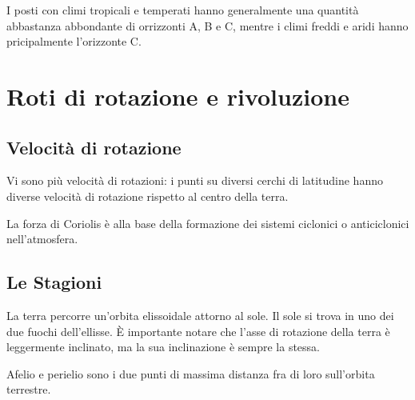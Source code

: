 \documentclass[a4paper]{article}
\begin{document}
I posti con climi tropicali e temperati hanno generalmente una quantità
abbastanza abbondante di orrizzonti A, B e C, mentre i climi freddi e aridi hanno pricipalmente
l'orizzonte C.

\pagebreak

\section{Roti di rotazione e rivoluzione}

\subsection{Velocità di rotazione}

Vi sono più velocità di rotazioni: i punti su diversi cerchi di latitudine hanno diverse velocità di rotazione rispetto al centro della terra.


La forza di Coriolis è alla base della formazione dei sistemi ciclonici o anticiclonici nell'atmosfera.

\subsection{Le Stagioni}

La terra percorre un'orbita elissoidale attorno al sole. Il sole si trova in uno dei due fuochi dell'ellisse.
È importante notare che l'asse di rotazione della terra è leggermente inclinato, ma la sua
inclinazione è sempre la stessa.



Afelio e perielio sono i due punti di massima distanza fra di loro sull'orbita terrestre.

\end{document}
